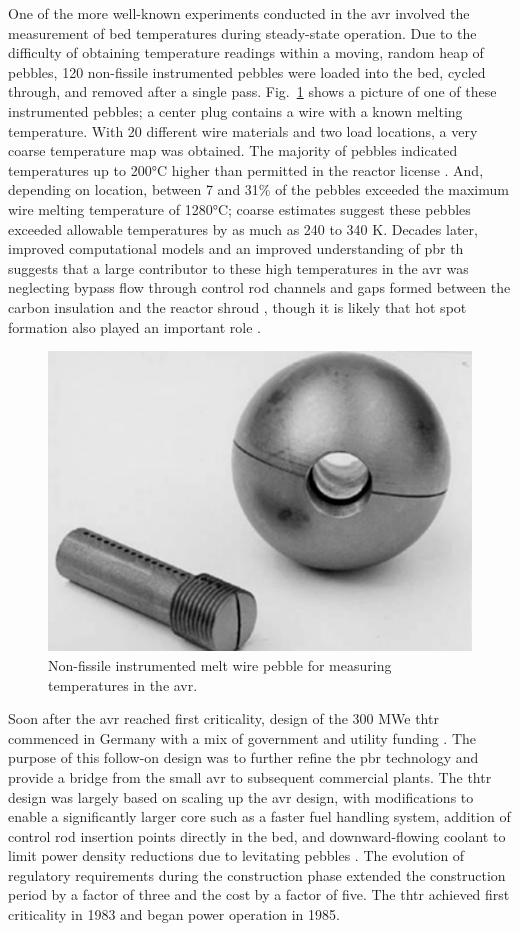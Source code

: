 One of the more well-known experiments conducted in the \gls{avr} involved the measurement of bed temperatures during steady-state operation. Due to the difficulty of obtaining temperature readings within a moving, random heap of pebbles, 120 non-fissile instrumented pebbles were loaded into the bed, cycled through, and removed after a single pass. Fig.\ \ref{fig:avr_melt} shows a picture of one of these instrumented pebbles; a center plug contains a wire with a known melting temperature. With 20 different wire materials and two load locations, a very coarse temperature map was obtained. The majority of pebbles indicated temperatures up to 200\si{\celsius} higher than permitted in the reactor license \cite{sobes,moormann}. And, depending on location, between 7 and 31\% of the pebbles exceeded the maximum wire melting temperature of 1280\si{\celsius}; coarse estimates suggest these pebbles exceeded allowable temperatures by as much as 240 to 340 K. Decades later, improved computational models and an improved understanding of \gls{pbr} \gls{th} suggests that a large contributor to these high temperatures in the \gls{avr} was neglecting bypass flow through control rod channels and gaps formed between the carbon insulation and the reactor shroud \cite{viljoen}, though it is likely that hot spot formation also played an important role \cite{moormann}.

\begin{figure}[!h]
\centering
\includegraphics[width=0.4\linewidth]{figs/avr_melt_wire.png}
\caption{Non-fissile instrumented melt wire pebble for measuring temperatures in the \gls{avr}.}
\label{fig:avr_melt}
\end{figure}

Soon after the \gls{avr} reached first criticality, design of the 300 MWe \gls{thtr} commenced in Germany with a mix of government and utility funding \cite{oehme,thtr_1990,hecker,hofmann}. The purpose of this follow-on design was to further refine the \gls{pbr} technology and provide a bridge from the small \gls{avr} to subsequent commercial plants. The \gls{thtr} design was largely based on scaling up the \gls{avr} design, with modifications to enable a significantly larger core such as a faster fuel handling system, addition of control rod insertion points directly in the bed, and downward-flowing coolant to limit power density reductions due to levitating pebbles \cite{claxton}. The evolution of regulatory requirements during the construction phase extended the construction period by a factor of three and the cost by a factor of five. The \gls{thtr} achieved first criticality in 1983 and began power operation in 1985. 

